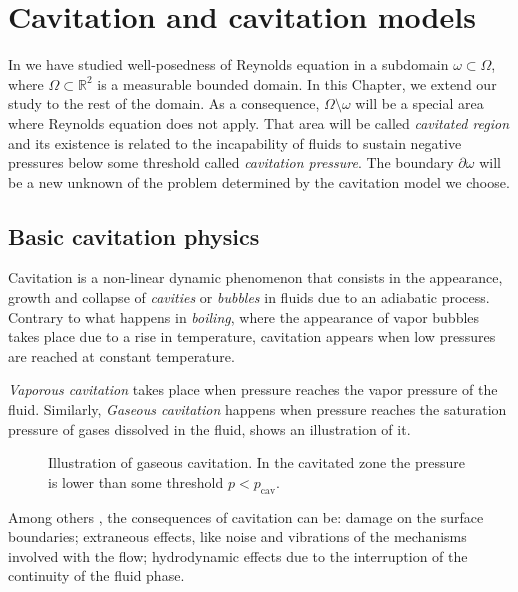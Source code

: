 \chapter{Cavitation and cavitation models}
\label{chap:cavitation_models}

In  we have studied well-posedness of Reynolds equation in a subdomain $\omega\subset \Omega$, where $\Omega\subset \mathbb{R}^2$ is a measurable bounded domain. In this Chapter, we extend our study to the rest of the domain. As a consequence, $\Omega\setminus \omega$ will be a special area where Reynolds equation does not apply. That area will be called \emph{cavitated region} and its existence is related to the incapability of fluids to sustain negative pressures below some threshold called \emph{cavitation pressure}. The boundary $\partial \omega$ will be a new unknown of the problem determined by the cavitation model we choose.	

\section{Basic cavitation physics}
\label{sec:basic_cav_physics}
Cavitation is a non-linear dynamic phenomenon that consists in the appearance, growth and collapse of \emph{cavities} or \emph{bubbles} in fluids due to an adiabatic process. Contrary to what happens in \emph{boiling}, where the appearance of vapor bubbles takes place due to a rise in temperature, cavitation appears when low pressures are reached at constant temperature.

\emph{Vaporous cavitation} takes place when pressure reaches the vapor pressure of the fluid. Similarly, \emph{Gaseous cavitation} happens when pressure reaches the saturation pressure of gases dissolved in the fluid,  shows an illustration of it.
\begin{figure}[ht!]
\centering 
\def\svgwidth{\textwidth}	
\caption[Illustration of gaseous cavitation]{Illustration of gaseous cavitation. In the cavitated zone the pressure is lower than 
 some threshold  $p<p_\text{cav}$.}\label{fig:gaseous_cavitation}
\end{figure}

Among others \cite{knapp1970}, the consequences of cavitation can be: damage on the surface boundaries; extraneous effects, like noise and vibrations of the mechanisms involved with the flow; hydrodynamic effects due to the interruption of the continuity of the fluid phase. %

